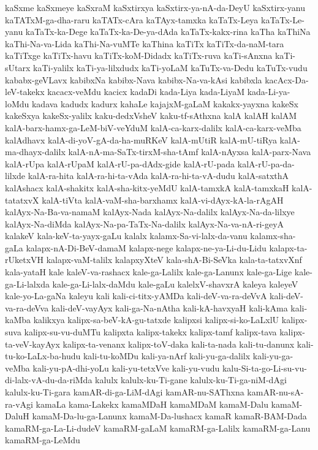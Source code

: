 {kaSxme
kaSxmeye
kaSxraM
kaSxtirxya
kaSxtirx-ya-nA-da-DeyU
kaSxtirx-yanu
kaTATxM-ga-dha-raru
kaTATx-cAra
kaTAyx-tamxka
kaTaTx-Leya
kaTaTx-Le-yanu
kaTaTx-ka-Dege
kaTaTx-ka-De-ya-dAda
kaTaTx-kakx-rina
kaTha
kaThiNa
kaThi-Na-va-Lida
kaThi-Na-vuMTe
kaThina
kaTiTx
kaTiTx-da-naM-tara
kaTiTxge
kaTiTx-havu
kaTiTx-koM-Didadx
kaTiTx-ruva
kaTi-sAnxna
kaTi-sUtarx
kaTi-yalilx
kaTi-ya-lilxdudx
kaTi-yoLaM
kaTuTx-va-Dedu
kaTuTx-vudu
kababx-geVLavx
kabibxNa
kabibx-Nava
kabibx-Na-va-kAsi
kabibxla
kacAcx-Da-leV-takekx
kacacx-veMdu
kacicx
kadaDi
kada-Liya
kada-LiyaM
kada-Li-ya-loMdu
kadava
kadudx
kadurx
kahaLe
kajajxM-gaLaM
kakakx-yayxna
kakeSx
kakeSxya
kakeSx-yalilx
kaku-dedxVsheV
kaku-tf-sAthxna
kalA
kalAH
kalAM
kalA-barx-hamx-ga-LeM-biV-veYduM
kalA-ca-karx-dalilx
kalA-ca-karx-veMba
kalAdhavx
kalA-di-yoV-gA-da-ha-muRKeV
kalA-mUtiR
kalA-mU-tiRya
kalA-ma-dhayx-dalilx
kalA-nA-ma-SaTx-tirxM-sha-tAmf
kalA-nAyxsa
kalA-parx-Nava
kalA-rUpa
kalA-rUpaM
kalA-rU-pa-dAdx-gide
kalA-rU-pada
kalA-rU-pa-da-lilxde
kalA-ra-hita
kalA-ra-hi-ta-vAda
kalA-ra-hi-ta-vA-dudu
kalA-satxthA
kalAshacx
kalA-shakitx
kalA-sha-kitx-yeMdU
kalA-tamxkA
kalA-tamxkaH
kalA-tatatxvX
kalA-tiVta
kalA-vaM-sha-barxhamx
kalA-vi-dAyx-kA-la-rAgAH
kalAyx-Na-Ba-va-namaM
kalAyx-Nada
kalAyx-Na-dalilx
kalAyx-Na-da-lilxye
kalAyx-Na-diMda
kalAyx-Na-pa-TaTx-Na-dalilx
kalAyx-Na-va-nA-ri-geyA
kalakeV
kala-keV-ta-yayx-gaLu
kalalx
kalamx-Sa-vi-lalx-da-vanu
kalamx-sha-gaLa
kalapx-nA-Di-BeV-damaM
kalapx-nege
kalapx-ne-ya-Li-du-Lidu
kalapx-ta-rUketxVH
kalapx-vaM-talilx
kalapxyXteV
kala-shA-Bi-SeVka
kala-ta-tatxvXnf
kala-yataH
kale
kaleV-va-rashacx
kale-ga-Lalilx
kale-ga-Lanunx
kale-ga-Lige
kale-ga-Li-lalxda
kale-ga-Li-lalx-daMdu
kale-gaLu
kalelxV-shavxrA
kaleya
kaleyeV
kale-yo-La-gaNa
kaleyu
kali
kali-ci-titx-yAMDa
kali-deV-va-ra-deVvA
kali-deV-va-ra-deVva
kali-deV-vayAyx
kali-ga-Na-nAtha
kali-kA-havxyaH
kali-kAma
kali-kaMba
kalikxya
kalipx-sa-beV-kA-gu-tatxde
kalipxsi
kalipx-si-ko-LaLxlU
kalipx-suva
kalipx-su-vu-duMTu
kalipxta
kalipx-takekx
kalipx-tamf
kalipx-tava
kalipx-ta-veV-kayAyx
kalipx-ta-venanx
kalipx-toV-daka
kali-ta-nada
kali-tu-danunx
kali-tu-ko-LaLx-ba-hudu
kali-tu-koMDu
kali-ya-nArf
kali-yu-ga-dalilx
kali-yu-ga-veMba
kali-yu-pA-dhi-yoLu
kali-yu-tetxVve
kali-yu-vudu
kalu-Si-ta-go-Li-su-vu-di-lalx-vA-du-da-riMda
kalulx
kalulx-ku-Ti-gane
kalulx-ku-Ti-ga-niM-dAgi
kalulx-ku-Ti-gara
kamAR-di-ga-LiM-dAgi
kamAR-nu-SAThxna
kamAR-nu-sA-ra-vAgi
kamaLa
kama-Lakekx
kamaMDaH
kamaMDaM
kamaM-Dalu
kamaM-DaluH
kamaM-Da-lu-ga-Lanunx
kamaM-Da-lushacx
kamaR
kamaR-BAM-Dada
kamaRM-ga-La-Li-dudeV
kamaRM-gaLaM
kamaRM-ga-Lalilx
kamaRM-ga-Lanu
kamaRM-ga-LeMdu
}
